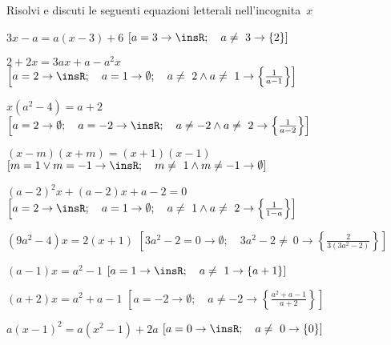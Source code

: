 \begin{esercizio}[\Ast]
\begin{enumeratea}
\end{enumeratea}
\end{esercizio}

\begin{esercizio}[\Ast]
\label{ese:20.38}
Risolvi e discuti le seguenti equazioni letterali nell'incognita~$x$
\begin{enumeratea}
 \item $3x-a=a(x-3)+6$
\hfill $\left[a=3 \rightarrow \insR; \quad a\neq~3 \rightarrow \{2\}\right]$
 \item $2+2x=3ax+a-a^{2}x$
\hfill $\left[a=2 \rightarrow \insR; \quad 
a=1 \rightarrow \emptyset; \quad 
a\neq~2\wedge a\neq~1 \rightarrow \left\{\frac{1}{a-1}\right\}\right]$
 \item $x(a^{2}-4)=a+2$
\hfill $\left[a=2 \rightarrow \emptyset; \quad 
a=-2 \rightarrow \insR; \quad 
a\neq -2\wedge a\neq~2 \rightarrow \left\{\frac{1}{a-2}\right\}\right]$
 \item $(x-m)(x+m)=(x+1)(x-1)$
\hfill $\left[m=1\vee m=-1 \rightarrow \insR; \quad 
m\neq~1\wedge m\neq -1 \rightarrow \emptyset\right]$
 \item $(a-2)^{2}x+(a-2)x+a-2=0$
\hfill $\left[a=2 \rightarrow \insR; \quad 
a=1 \rightarrow \emptyset; \quad 
a\neq~1\wedge a\neq~2 \rightarrow \left\{\frac{1}{1-a}\right\}\right]$
 \item $\left(9a^{2}-4\right)x=2(x+1)$
\hfill $\left[3a^{2}-2=0 \rightarrow \emptyset; \quad 
3a^{2}-2\neq~0 \rightarrow \left\{\frac{2}{3(3a^{2}-2)}\right\}\right]$
 \item $(a-1)x=a^{2}-1$
\hfill $\left[a=1 \rightarrow \insR; \quad 
a\neq~1 \rightarrow \{a+1\}\right]$
 \item $(a+2)x=a^{2}+a-1$
\hfill $\left[a=-2 \rightarrow \emptyset; \quad 
a\neq -2 \rightarrow \left\{\frac{a^{2}+a-1}{a+2}\right\}\right]$
 \item $a(x-1)^{2}=a(x^{2}-1)+2a$
\hfill $\left[a=0 \rightarrow \insR; \quad a\neq~0 \rightarrow \{0\}\right]$

\end{enumeratea}
\end{esercizio}
